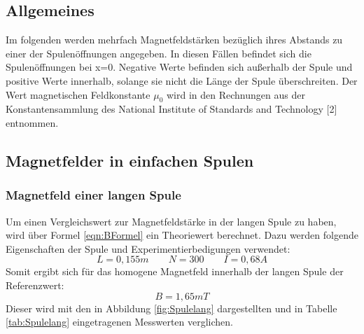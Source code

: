 \documentclass[titlepage = firstcover]{scrartcl}
\begin{document}
        \subsection{Allgemeines}
            Im folgenden werden mehrfach Magnetfeldstärken bezüglich ihres Abstands zu einer der Spulenöffnungen angegeben. In diesen Fällen befindet sich die 
            Spulenöffnungen bei x=0. Negative Werte befinden sich außerhalb der Spule und positive Werte innerhalb, solange sie nicht die Länge der Spule 
            überschreiten. Der Wert magnetischen Feldkonstante $\mu_0$ wird in den Rechnungen aus der Konstantensammlung des National Institute of Standards 
            and Technology [2] entnommen.
        \subsection{Magnetfelder in einfachen Spulen}
            \subsubsection{Magnetfeld einer langen Spule}
                Um einen Vergleichswert zur Magnetfeldstärke in der langen Spule zu haben, wird über Formel \ref{eqn:BFormel} ein Theoriewert berechnet. Dazu werden folgende 
                Eigenschaften der Spule und Experimentierbedigungen verwendet:
                \begin{equation*}  
                    L = 0,155m \qquad N = 300 \qquad I = 0,68 A 
                \end{equation*}    
                Somit ergibt sich für das homogene Magnetfeld innerhalb der langen Spule der Referenzwert:
                \begin{equation}
                    B = 1,65 mT 
                    \label{eqn:BLang}
                \end{equation}
                Dieser wird mit den in Abbildung \ref{fig:Spulelang} dargestellten und in Tabelle \ref{tab:Spulelang} eingetragenen Messwerten verglichen.
    
\end{document}
